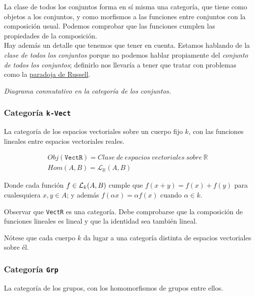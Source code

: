 \documentclass[11pt, fleqn, spanish]{book}
\begin{document}
La clase de todos los conjuntos forma en sí misma una categoría, que
tiene como objetos a los conjuntos, y como morfismos a las funciones
entre conjuntos con la composición usual. Podemos comprobar que las
funciones cumplen las propiedades de la composición. \\

Hay además un detalle que tenemos que tener en cuenta. Estamos hablando
de la \textit{clase de todos los conjuntos} porque no podemos hablar
propiamente del \textit{conjunto de todos los conjuntos}; definirlo nos
llevaría a tener que tratar con problemas como la \href{https://es.wikipedia.org/wiki/Paradoja_de_Russell}{paradoja de Russell}.


\textit{Diagrama conmutativo en la categoría de los conjuntos.} \\


\subsubsection{Categoría \texttt{k-Vect}}
La categoría de los espacios vectoriales sobre un cuerpo fijo $k$, con
las funciones lineales entre espacios vectoriales reales.

\begin{gather*}
  Obj(\texttt{VectR}) = Clase\ de\ espacios\ vectoriales\ sobre\ \mathbb{R} \\
  Hom(A,B)= \mathcal{L}_{\mathbb{R}}(A,B)
\end{gather*}

Donde cada función $f \in {\cal L}_k(A,B)$ cumple que $f(x+y) = f(x)+f(y)$ para cualesquiera $x,y \in A$;
y además $f(\alpha x) = \alpha f(x)$ cuando $\alpha \in k$.

\begin{exercise} 
  Observar que \texttt{VectR} es una categoría. Debe comprobarse que
  la composición de funciones lineales es lineal y que la identidad sea
  también lineal.
\end{exercise}

Nótese que cada cuerpo $k$ da lugar a una categoría distinta de espacios
vectoriales sobre él.


\subsubsection{Categoría \texttt{Grp}}
La categoría de los grupos, con los homomorfismos de grupos entre ellos.
\end{document}
